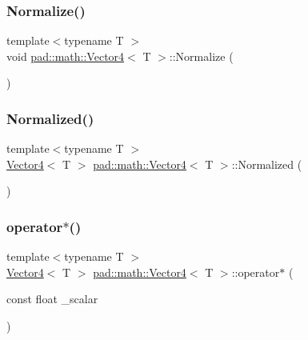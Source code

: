\subsubsection{\texorpdfstring{Normalize()}{Normalize()}}
{\footnotesize\ttfamily template$<$typename T $>$ \\
void \mbox{\hyperlink{structpad_1_1math_1_1_vector4}{pad\+::math\+::\+Vector4}}$<$ T $>$\+::Normalize (\begin{DoxyParamCaption}{ }\end{DoxyParamCaption})}

\mbox{\label{structpad_1_1math_1_1_vector4_a984da7891140213ff81038628beae587}} 
\subsubsection{\texorpdfstring{Normalized()}{Normalized()}}
{\footnotesize\ttfamily template$<$typename T $>$ \\
\mbox{\hyperlink{structpad_1_1math_1_1_vector4}{Vector4}}$<$ T $>$ \mbox{\hyperlink{structpad_1_1math_1_1_vector4}{pad\+::math\+::\+Vector4}}$<$ T $>$\+::Normalized (\begin{DoxyParamCaption}{ }\end{DoxyParamCaption})}

\mbox{\label{structpad_1_1math_1_1_vector4_a57e32bb850ebd1b9ac4a6adf36ebfbe4}} 
\subsubsection{\texorpdfstring{operator$\ast$()}{operator*()}}
{\footnotesize\ttfamily template$<$typename T $>$ \\
\mbox{\hyperlink{structpad_1_1math_1_1_vector4}{Vector4}}$<$ T $>$ \mbox{\hyperlink{structpad_1_1math_1_1_vector4}{pad\+::math\+::\+Vector4}}$<$ T $>$\+::operator$\ast$ (\begin{DoxyParamCaption}\item[{const float}]{\+\_\+scalar }\end{DoxyParamCaption})}

